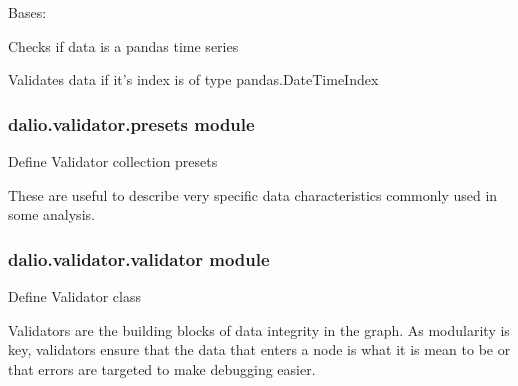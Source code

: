 \documentclass[letterpaper,10pt,english]{sphinxmanual}
\begin{document}
\begin{fulllineitems}
\label{\detokenize{dalio.validator:dalio.validator.pandas_val.IS_PD_TS}}
Bases: {\hyperref[\detokenize{dalio.validator:dalio.validator.base_val.IS_TYPE}]{}}

Checks if data is a pandas time series

\begin{fulllineitems}
\label{\detokenize{dalio.validator:dalio.validator.pandas_val.IS_PD_TS.validate}}
Validates data if it’s index is of type pandas.DateTimeIndex

\end{fulllineitems}


\end{fulllineitems}



\subsubsection{dalio.validator.presets module}
\label{\detokenize{dalio.validator:module-dalio.validator.presets}}\label{\detokenize{dalio.validator:dalio-validator-presets-module}}
Define Validator collection presets

These are useful to describe very specific data characteristics commonly used
in some analysis.


\subsubsection{dalio.validator.validator module}
\label{\detokenize{dalio.validator:module-dalio.validator.validator}}\label{\detokenize{dalio.validator:dalio-validator-validator-module}}
Define Validator class

Validators are the building blocks of data integrity in the graph. As
modularity is key, validators ensure that the data that enters a node is what
it is mean to be or that errors are targeted to make debugging easier.
\end{document}
